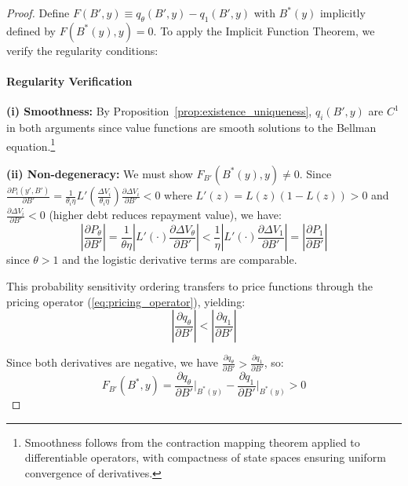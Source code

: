 \documentclass[12pt]{article}
\theoremstyle{plain}
\begin{document}
\begin{proof}
	Define $F(B', y) \equiv q_\theta(B', y) - q_1(B', y)$ with $B^*(y)$ implicitly defined by $F(B^*(y), y) = 0$. To apply the Implicit Function Theorem, we verify the regularity conditions:

	\paragraph{Regularity Verification}
	\textbf{(i) Smoothness:} By Proposition~\ref{prop:existence_uniqueness}, $q_i(B', y)$ are $C^1$ in both arguments since value functions are smooth solutions to the Bellman equation.\footnote{Smoothness follows from the contraction mapping theorem applied to differentiable operators, with compactness of state spaces ensuring uniform convergence of derivatives.}

	\textbf{(ii) Non-degeneracy:} We must show $F_{B'}(B^*(y), y) \neq 0$. Since $\frac{\partial P_i(y',B')}{\partial B'} = \frac{1}{\theta_i\eta} L'\left(\frac{\Delta V_i}{\theta_i\eta}\right) \frac{\partial \Delta V_i}{\partial B'} < 0$ where $L'(z) = L(z)(1-L(z)) > 0$ and $\frac{\partial \Delta V_i}{\partial B'} < 0$ (higher debt reduces repayment value), we have:
	\begin{equation}
		\left|\frac{\partial P_\theta}{\partial B'}\right| = \frac{1}{\theta\eta}\left|L'(\cdot)\frac{\partial \Delta V_\theta}{\partial B'}\right| < \frac{1}{\eta}\left|L'(\cdot)\frac{\partial \Delta V_1}{\partial B'}\right| = \left|\frac{\partial P_1}{\partial B'}\right| \label{eq:prob_sensitivity_order}
	\end{equation}
	since $\theta > 1$ and the logistic derivative terms are comparable.

	This probability sensitivity ordering transfers to price functions through the
	pricing operator (\ref{eq:pricing_operator}), yielding:
	\begin{equation}
		\left|\frac{\partial q_\theta}{\partial B'}\right| < \left|\frac{\partial q_1}{\partial B'}\right| \label{eq:price_sensitivity_ordering}
	\end{equation}

	Since both derivatives are negative, we have $\frac{\partial q_\theta}{\partial
			B'} > \frac{\partial q_1}{\partial B'}$, so:
	\begin{equation}
		F_{B'}(B^*, y) = \frac{\partial q_\theta}{\partial B'}\bigg|_{B^*(y)} - \frac{\partial q_1}{\partial B'}\bigg|_{B^*(y)} > 0 \label{eq:denominator_sign}
	\end{equation}


\end{proof}
\end{document}
